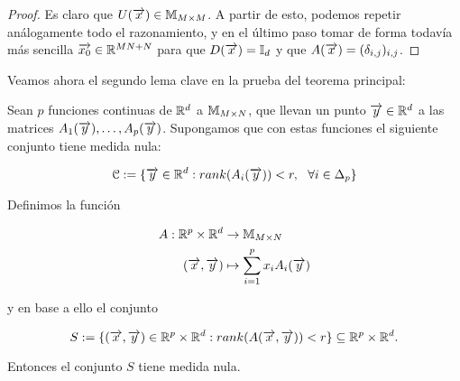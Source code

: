 \begin{proof}
    Es claro que $U(\overrightarrow{x}) \in \mathbb{M}_{M \times M}$. A partir de esto, podemos repetir análogamente todo el razonamiento, y en el último paso tomar de forma todavía más sencilla $\overrightarrow{x_0} \in \mathbb{R}^{MN + N}$ para que $D(\overrightarrow{x}) = \mathbb{I}_d$ y que $A(\overrightarrow{x}) = (\delta_{i, j})_{i, j}$.
\end{proof}


Veamos ahora el segundo lema clave en la prueba del teorema principal:

\begin{lema} \label{lema:segundo_lema}
    Sean $p$ funciones continuas de $\mathbb{R}^d$ a $\mathbb{M}_{M \times N}$, que llevan un punto $\overrightarrow{y} \in \mathbb{R}^d$ a las matrices $A_1(\overrightarrow{y}), \ldots, A_p(\overrightarrow{y})$. Supongamos que con estas funciones el siguiente conjunto tiene medida nula:

    \begin{equation}
        \mathcal{C} := \{ \overrightarrow{y} \in \mathbb{R}^d : rank(A_i(\overrightarrow{y})) < r, \ \  \forall i \in \Delta_{p} \}
    \end{equation}

    Definimos la función

    \begin{equation}
        \begin{split}
            A: \mathbb{R}^p \times \mathbb{R}^d &\to \mathbb{M}_{M \times N} \\
            (\overrightarrow{x}, \overrightarrow{y}) &\mapsto \sum_{i = 1}^p x_i A_i(\overrightarrow{y})
        \end{split}
    \end{equation}

    y en base a ello el conjunto

    \begin{equation}
        S := \{ (\overrightarrow{x}, \overrightarrow{y}) \in  \mathbb{R}^p \times \mathbb{R}^d: rank(A(\overrightarrow{x}, \overrightarrow{y})) < r \} \subseteq \mathbb{R}^p \times \mathbb{R}^d.
    \end{equation}

    Entonces el conjunto $S$ tiene medida nula.
\end{lema}

